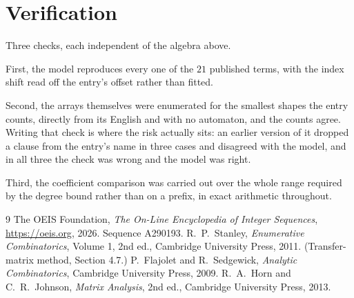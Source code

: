 \documentclass[11pt,a4paper]{article}
\theoremstyle{plain}
\theoremstyle{definition}
\begin{document}
\section{Verification}

Three checks, each independent of the algebra above.

First, the model reproduces every one of the $21$ published terms, with the index shift
read off the entry's offset rather than fitted.

Second, the arrays themselves were enumerated for the smallest shapes the entry counts,
directly from its English and with no automaton, and the counts agree. Writing that check is
where the risk actually sits: an earlier version of it dropped a clause from the entry's name
in three cases and disagreed with the model, and in all three the check was wrong and the model
was right.

Third, the coefficient comparison was carried out over the whole range required by the degree
bound rather than on a prefix, in exact arithmetic throughout.

\begin{thebibliography}{9}
 The OEIS Foundation, \emph{The On-Line Encyclopedia of Integer
Sequences}, \url{https://oeis.org}, 2026. Sequence A290193.
 R.~P.~Stanley, \emph{Enumerative Combinatorics}, Volume 1, 2nd ed.,
Cambridge University Press, 2011. (Transfer-matrix method, Section 4.7.)
 P.~Flajolet and R.~Sedgewick, \emph{Analytic Combinatorics}, Cambridge
University Press, 2009.
 R.~A.~Horn and C.~R.~Johnson, \emph{Matrix Analysis}, 2nd ed., Cambridge
University Press, 2013.
\end{thebibliography}
\end{document}
